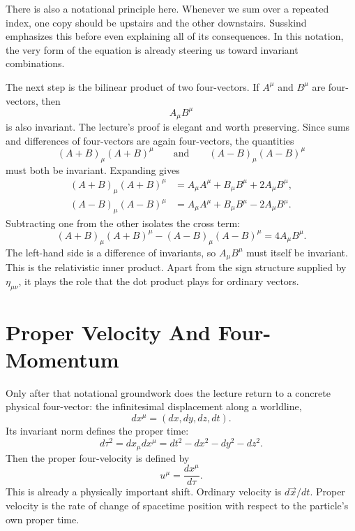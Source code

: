 There is also a notational principle here. Whenever we sum over a repeated index, one copy should be upstairs and the other downstairs. Susskind emphasizes this before even explaining all of its consequences. In this notation, the very form of the equation is already steering us toward invariant combinations.

The next step is the bilinear product of two four-vectors. If \(A^\mu\) and \(B^\mu\) are four-vectors, then
\begin{equation}
A_{\mu}B^{\mu}
\end{equation}
is also invariant. The lecture's proof is elegant and worth preserving. Since sums and differences of four-vectors are again four-vectors, the quantities
\[
(A+B)_\mu(A+B)^\mu
\qquad\text{and}\qquad
(A-B)_\mu(A-B)^\mu
\]
must both be invariant. Expanding gives
\begin{align}
(A+B)_\mu(A+B)^\mu&=A_\mu A^\mu+B_\mu B^\mu+2A_\mu B^\mu,\\
(A-B)_\mu(A-B)^\mu&=A_\mu A^\mu+B_\mu B^\mu-2A_\mu B^\mu.
\end{align}
Subtracting one from the other isolates the cross term:
\begin{equation}
(A+B)_\mu(A+B)^\mu-(A-B)_\mu(A-B)^\mu=4A_\mu B^\mu.
\end{equation}
The left-hand side is a difference of invariants, so \(A_\mu B^\mu\) must itself be invariant. This is the relativistic inner product. Apart from the sign structure supplied by \(\eta_{\mu\nu}\), it plays the role that the dot product plays for ordinary vectors.

\section{Proper Velocity And Four-Momentum}

Only after that notational groundwork does the lecture return to a concrete physical four-vector: the infinitesimal displacement along a worldline,
\[
dx^\mu=(dx,dy,dz,dt).
\]
Its invariant norm defines the proper time:
\begin{equation}
d\tau^2=dx_\mu dx^\mu=dt^2-dx^2-dy^2-dz^2.
\end{equation}
Then the proper four-velocity is defined by
\begin{equation}
u^\mu=\frac{dx^\mu}{d\tau}.
\end{equation}
This is already a physically important shift. Ordinary velocity is \(d\vec x/dt\). Proper velocity is the rate of change of spacetime position with respect to the particle's own proper time.


